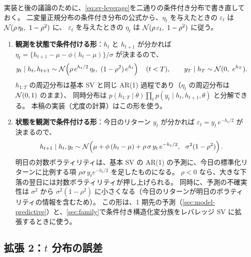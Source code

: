 実装と後の議論のために、\cref{eq:sv-leverage}を二通りの条件付き分布で書き直しておく。
二変量正規分布の条件付き分布の公式から、$\eta_t$ を与えたときの $\varepsilon_t$ は $\mathcal{N}(\rho\,\eta_t,\ 1-\rho^2)$ に、
$\varepsilon_t$ を与えたときの $\eta_t$ は $\Normal(\rho\,\varepsilon_t,\ 1-\rho^2)$ に従う。
\begin{enumerate}[label=(\alph*)]
  \item \textbf{観測を状態で条件付ける形}：$h_t$ と $h_{t+1}$ が分かれば $\eta_t = \{h_{t+1} - \mu - \phi(h_t - \mu)\}/\sigma$ が決まるので、
    \begin{equation}
      y_t \mid h_t, h_{t+1} \sim \mathcal{N}\!\left(\rho\, e^{h_t/2}\, \eta_t,\ (1-\rho^2)\, e^{h_t}\right) \quad (t < T), \qquad
      y_T \mid h_T \sim \mathcal{N}(0,\ e^{h_T}).
      \label{eq:sv-leverage-obs}
    \end{equation}
    $h_{1:T}$ の周辺分布は基本 SV と同じ AR(1) 過程であり（$\eta_t$ の周辺分布は $\mathcal{N}(0, 1)$ のまま）、
    同時分布は $p(h_{1:T} \mid \theta) \prod_{t} p(y_t \mid h_t, h_{t+1}, \theta)$ と分解できる。
    本稿の実装（尤度の計算）はこの形を使う。
  \item \textbf{状態を観測で条件付ける形}：今日のリターン $y_t$ が分かれば $\varepsilon_t = y_t\, e^{-h_t/2}$ が決まるので、
    \begin{equation}
      h_{t+1} \mid h_t, y_t \sim \mathcal{N}\!\left(\mu + \phi\,(h_t - \mu) + \rho\,\sigma\, y_t\, e^{-h_t/2},\ \ \sigma^2 (1-\rho^2)\right).
      \label{eq:sv-leverage-state}
    \end{equation}
    明日の対数ボラティリティは、基本 SV の AR(1) の予測に、今日の標準化リターンに比例する項 $\rho\sigma\, y_t e^{-h_t/2}$ を足したものになる。
    $\rho < 0$ なら、大きな下落の翌日には対数ボラティリティが押し上げられる。
    同時に、予測の不確実性は $\sigma^2$ から $\sigma^2(1-\rho^2)$ に小さくなる（今日のリターンが明日のボラティリティの情報を含むため）。
    この形は、1 期先の予測（\cref{sec:model-predictive}）と、\cref{sec:family}で条件付き構造化変分族をレバレッジ SV に拡張するときに使う。
\end{enumerate}

\subsection{拡張 2：\texorpdfstring{$t$}{t} 分布の誤差}\label{sec:model-t}

